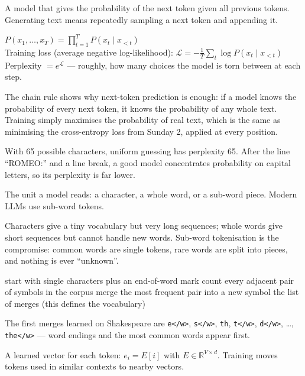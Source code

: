 \documentclass[11pt,a4paper]{article}
\begin{document}
\begin{bdef}
A model that gives the probability of the next token given all previous tokens. Generating text means repeatedly sampling a next token and appending it.
\end{bdef}
\begin{bmath}
$P(x_1,\dots,x_T)=\prod_{t=1}^{T}P(x_t\mid x_{<t})$\\[3pt]
Training loss (average negative log-likelihood): $\mathcal{L}=-\frac1T\sum_t\log P(x_t\mid x_{<t})$\\[3pt]
Perplexity $=e^{\mathcal{L}}$ --- roughly, how many choices the model is torn between at each step.
\end{bmath}
The chain rule shows why next-token prediction is enough: if a model knows the probability of every next token, it knows the probability of any whole text. Training simply maximises the probability of real text, which is the same as minimising the cross-entropy loss from Sunday 2, applied at every position.
\begin{bex}
With 65 possible characters, uniform guessing has perplexity 65. After the line ``ROMEO:'' and a line break, a good model concentrates probability on capital letters, so its perplexity is far lower.
\end{bex}

\begin{bdef}[Token]
The unit a model reads: a character, a whole word, or a sub-word piece. Modern LLMs use sub-word tokens.
\end{bdef}
Characters give a tiny vocabulary but very long sequences; whole words give short sequences but cannot handle new words. Sub-word tokenisation is the compromise: common words are single tokens, rare words are split into pieces, and nothing is ever ``unknown''.
\begin{balgo}
\begin{algorithmic}[1]
\State start with single characters plus an end-of-word mark
  \State count every adjacent pair of symbols in the corpus
  \State merge the most frequent pair into a new symbol
\EndFor
\State \Return the list of merges (this defines the vocabulary)
\end{algorithmic}
\end{balgo}
\begin{bres}
The first merges learned on Shakespeare are \texttt{e</w>}, \texttt{s</w>}, \texttt{th}, \texttt{t</w>}, \texttt{d</w>}, \ldots, \texttt{the</w>} --- word endings and the most common words appear first.
\end{bres}
\begin{bdef}[Embedding]
A learned vector for each token: $e_i=E[i]$ with $E\in\mathbb{R}^{V\times d}$. Training moves tokens used in similar contexts to nearby vectors.
\end{bdef}
\end{document}
